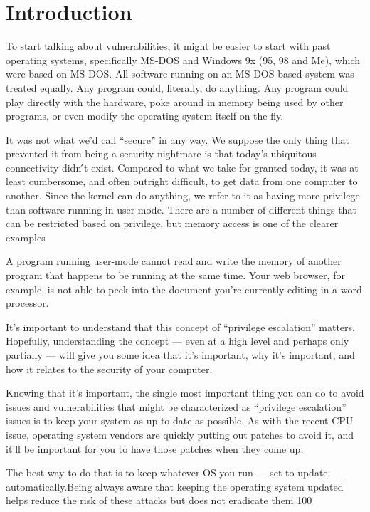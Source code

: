 \documentclass[letterpaper, 10pt, journal]{IEEEtran}
\begin{document}
\section{Introduction}
To start talking about vulnerabilities, it might be easier to start with past operating systems, specifically MS-DOS and Windows 9x (95, 98 and Me), which were based on MS-DOS.
All software running on an MS-DOS-based system was treated equally. Any program could, literally, do anything. Any program could play directly with the hardware, poke around in memory being used by other programs, or even modify the operating system itself on the fly.

It was not what we\'’d call \'“secure\'” in any way. We suppose the only thing that prevented it from being a security nightmare is that today’s ubiquitous connectivity didn\'’t exist. Compared to what we take for granted today, it was at least cumbersome, and often outright difficult, to get data from one computer to another. Since the kernel can do anything, we refer to it as having more privilege than software running in user-mode. There are a number of different things that can be restricted based on privilege, but memory access is one of the clearer examples

A program running user-mode cannot read and write the memory of another program that happens to be running at the same time. Your web browser, for example, is not able to peek into the document you’re currently editing in a word processor.

It’s important to understand that this concept of “privilege escalation” matters. Hopefully, understanding the concept — even at a high level and perhaps only partially — will give you some idea that it’s important, why it’s important, and how it relates to the security of your computer.

Knowing that it’s important, the single most important thing you can do to avoid issues and vulnerabilities that might be characterized as “privilege escalation” issues is to keep your system as up-to-date as possible. As with the recent CPU issue, operating system vendors are quickly putting out patches to avoid it, and it’ll be important for you to have those patches when they come up.

The best way to do that is to keep whatever OS you run — set to update automatically.Being always aware that keeping the operating system updated helps reduce the risk of these attacks but does not eradicate them 100%
\end{document}
